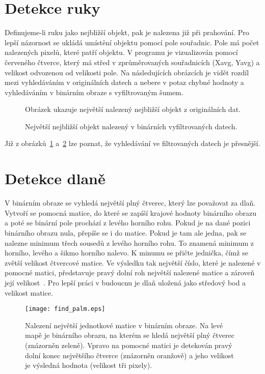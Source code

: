 \section{Detekce ruky}
Definujeme-li ruku jako nejbližší objekt, pak je nalezena již při prahování. Pro lepší názornost se ukládá umístění objektu pomocí pole souřadnic. Pole má počet nalezených pixelů, které patří objektu. V programu je vizualizován pomocí červeného čtverce, který má střed v zprůměrovaných souřadnicích (Xavg, Yavg) a velikost odvozenou od velikosti pole. 
Na následujících obrázcích je vidět rozdíl mezi vyhledáváním v originálních datech a nebere v potaz chybné hodnoty a vyhledáváním v binárním obraze s vyfiltrovaným šumem.
\begin{figure}[htp]
\centering
{}
\caption{Obrázek ukazuje největší nalezený nejbližší objekt z originálních dat.}
\label{pic15}
\end{figure}
\begin{figure}[htp]
\centering
{}
\caption{Největší nejbližší objekt nalezený v binárních vyfiltrovaných datech.}
\label{pic16}
\end{figure}

Již z obrázků~\ref{pic15} a~\ref{pic16} lze poznat, že vyhledávání ve filtrovaných datech je přesnější.
\newpage
\section{Detekce dlaně}
V binárním obraze se vyhledá největší plný čtverec, který lze považovat za dlaň. Vytvoří se pomocná matice, do které se zapíší krajové hodnoty binárního obrazu a poté se binární pole prochází z levého horního rohu. Pokud je na dané pozici binárního obrazu nula, přepíše se i do matice. Pokud je tam ale jedna, pak se nalezne minimum třech sousedů z levého horního rohu. To znamená minimum z horního, levého a šikmo horního nalevo. K minumu se přičte jednička, čímž se zvětší velikost čtvercové matice. Ve výsledku tak největší číslo, které je nalezené v pomocné matici, představuje pravý dolní roh největší nalezené matice a zároveň její velikost~\cite{23}. Pro lepší práci v budoucnu je dlaň uložená jako středový bod a velikost matice.

\begin{figure} [htp]
\centering
\texttt{[image: find\_palm.eps]}
\centering
\caption{Nalezení největší jednotkové matice v binárním obraze. Na levé mapě je binárního obrazu, na kterém se hledá největší plný čtverec (znázorněn zeleně). Vpravo na pomocné matici je detekován pravý dolní konec největšího čtverce (znázorněn oranžově) a jeho velikost je výsledná hodnota (velikost tři pixely). }
\label{pic17}
\end{figure}

